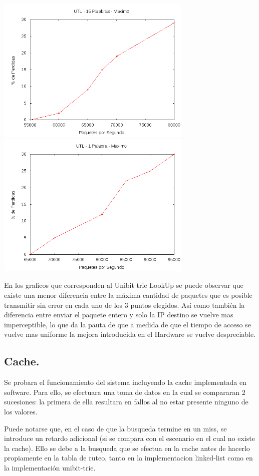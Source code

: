 \documentclass[12pt,spanish]{article}
\begin{document}
\begin{center}
\includegraphics[width=0.7\textwidth]{graf/utl15pmax.png}
\includegraphics[width=0.7\textwidth]{graf/utl1pmax.png}	
\end{center}

En los graficos que corresponden al Unibit trie LookUp se puede observar que existe una menor diferencia entre la máxima cantidad de paquetes que es posible transmitir sin error en cada uno de los 3 puntos elegidos. Así como también la diferencia entre enviar el paquete entero y solo la IP destino se vuelve mas imperceptible, lo que da la pauta de que a medida de que el tiempo de acceso se vuelve mas uniforme la mejora introducida en el Hardware se vuelve despreciable.

\subsection*{Cache.}

Se probara el funcionamiento del sistema incluyendo la cache implementada en software. Para ello, se efectuara una toma de datos en la cual se compararan 2 sucesiones: la primera de ella resultara en fallos al no estar presente ninguno de los valores.

Puede notarse que, en el caso de que la busqueda termine en un miss, se introduce un retardo adicional (si se compara con el escenario en el cual no existe la cache). Ello se debe a la busqueda que se efectua en la cache antes de hacerlo propiamente en la tabla de ruteo, tanto en la implementacion linked-list como en la implementación unibit-trie.
\end{document}
